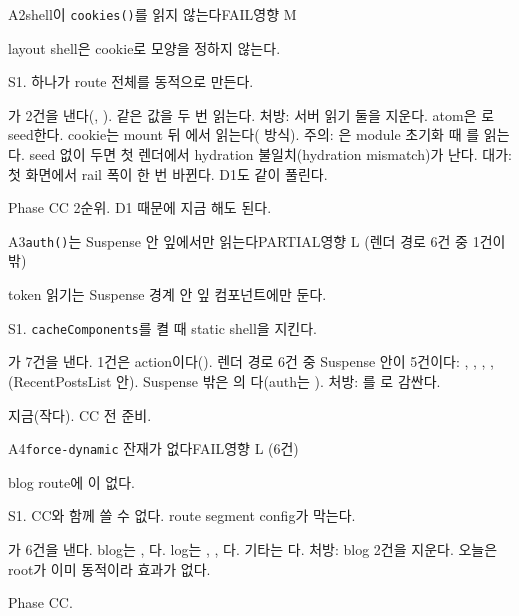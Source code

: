\begin{checkitem}{\ckopen}{A2}{shell이 \texttt{cookies()}를 읽지 않는다}{FAIL\ckdot{}영향 M}
  \item[What] layout shell은 cookie로 모양을 정하지 않는다.
  \item[Why] S1.  하나가 route 전체를 동적으로 만든다.
  \item[How] 가 2건을 낸다(, ). 같은 값을 두 번 읽는다. 처방: 서버 읽기 둘을 지운다. atom은 로 seed한다. cookie는 mount 뒤 에서 읽는다( 방식). 주의: 은 module 초기화 때 를 읽는다. seed 없이 두면 첫 렌더에서 hydration 불일치(hydration mismatch)가 난다. 대가: 첫 화면에서 rail 폭이 한 번 바뀐다. D1도 같이 풀린다.
  \item[When] Phase CC 2순위. D1 때문에 지금 해도 된다.
\end{checkitem}

\begin{checkitem}{\ckopen}{A3}{\texttt{auth()}는 Suspense 안 잎에서만 읽는다}{PARTIAL\ckdot{}영향 L (렌더 경로 6건 중 1건이 밖)}
  \item[What] token 읽기는 Suspense 경계 안 잎 컴포넌트에만 둔다.
  \item[Why] S1. \texttt{cacheComponents}를 켤 때 static shell을 지킨다.
  \item[How] 가 7건을 낸다. 1건은 action이다(). 렌더 경로 6건 중 Suspense 안이 5건이다: , , , , (RecentPostsList 안). Suspense 밖은 의 다(auth는 ). 처방: 를 로 감싼다.
  \item[When] 지금(작다). CC 전 준비.
\end{checkitem}

\begin{checkitem}{\ckopen}{A4}{\texttt{force-dynamic} 잔재가 없다}{FAIL\ckdot{}영향 L (6건)}
  \item[What] blog route에 이 없다.
  \item[Why] S1. CC와 함께 쓸 수 없다. route segment config가 막는다.
  \item[How] 가 6건을 낸다. blog는 , 다. log는 , , 다. 기타는 다. 처방: blog 2건을 지운다. 오늘은 root가 이미 동적이라 효과가 없다.
  \item[When] Phase CC.
\end{checkitem}

